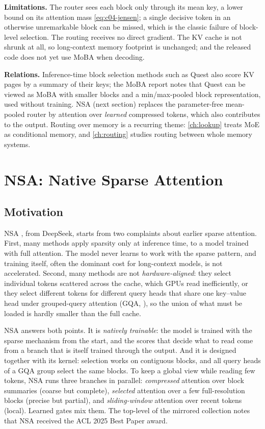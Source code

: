 \textbf{Limitations.} The router sees each block only through its mean key, a lower bound on its
attention mass \eqref{eq:c04-jensen}; a single decisive token in an otherwise unremarkable block
can be missed, which is the classic failure of block-level selection. The routing receives no
direct gradient. The KV cache is not shrunk at all, so long-context memory footprint is
unchanged; and the released code does not yet use MoBA when decoding.

\textbf{Relations.} Inference-time block selection methods such as Quest
\citep{c04-tang2024quest} also score KV pages by a summary of their keys; the MoBA report notes
that Quest can be viewed as MoBA with smaller blocks and a min/max-pooled block representation,
used without training. NSA (next section) replaces the parameter-free mean-pooled router by
attention over \emph{learned} compressed tokens, which also contributes to the output. Routing
over memory is a recurring theme: \cref{ch:lookup} treats MoE as conditional memory, and
\cref{ch:routing} studies routing between whole memory systems.

\section{NSA: Native Sparse Attention}\label{sec:c04-nsa}

\subsection{Motivation}

NSA \citep{yuan2025nsa}, from DeepSeek, starts from two complaints about earlier sparse attention.
First, many methods apply sparsity only at inference time, to a model trained with full
attention. The model never learns to work with the sparse pattern, and training itself, often
the dominant cost for long-context models, is not accelerated. Second, many methods are not
\emph{hardware-aligned}: they select individual tokens scattered across the cache, which GPUs read
inefficiently, or they select different tokens for different query heads that share one
key--value head under grouped-query attention (GQA, \citealp{c01-ainslie2023gqa}), so the union
of what must be loaded is hardly smaller than the full cache.

NSA answers both points. It is \emph{natively trainable}: the model is trained with the sparse
mechanism from the start, and the scores that decide what to read come from a branch that is
itself trained through the output. And it is designed together with its kernel: selection works on contiguous blocks, and
all query heads of a GQA group select the same blocks. To keep a global view while reading few
tokens, NSA runs three branches in parallel: \emph{compressed} attention over block summaries
(coarse but complete), \emph{selected} attention over a few full-resolution blocks (precise but
partial), and \emph{sliding-window} attention over recent tokens (local). Learned gates mix them.
The top-level  of the mirrored collection notes that NSA received the ACL 2025
Best Paper award.

